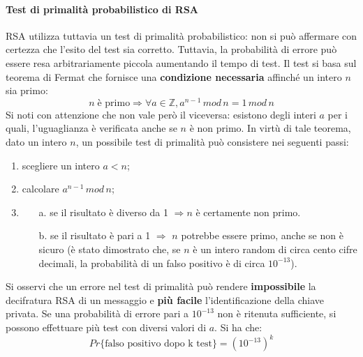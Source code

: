 \paragraph{Test di primalità probabilistico di RSA}
RSA utilizza tuttavia un test di primalità probabilistico: non si può affermare con certezza che l'esito del test sia corretto. Tuttavia, la probabilità di errore può essere resa arbitrariamente piccola aumentando il tempo di test. Il test si basa sul teorema di Fermat che fornisce una \textbf{condizione necessaria} affinché un intero $n$ sia primo: 
\begin{equation}
n \; \text{è primo} \Rightarrow \forall a \in \mathbb{Z}, a^{n-1} \, mod \, n  = 1 \, mod \, n
\end{equation}
Si noti con attenzione che non vale però il viceversa: esistono degli interi $a$ per i quali, l'uguaglianza è verificata anche se $n$ è non primo. In virtù di tale teorema, dato un intero $n$, un possibile test di primalità può consistere nei seguenti passi: 
\begin{enumerate}
\item scegliere un intero $a<n$;
\item calcolare $a^{n-1} \, mod \,n$;
\item \begin{enumerate} \item [a.] se il risultato è diverso da 1 $ \Rightarrow n$ è certamente non primo.
						\item [b.] se il risultato è pari a 1 $\Rightarrow $ $n$ potrebbe essere primo, anche se non è sicuro (è stato dimostrato che, se $n$ è un intero random di circa cento cifre decimali, la probabilità di un falso positivo è di circa $10^{-13}$).
	  \end{enumerate}
\end{enumerate}
Si osservi che un errore nel test di primalità può  rendere \textbf{impossibile} la decifratura RSA di un messaggio e \textbf{più facile} l'identificazione della chiave privata. 
\newline \newline
Se una probabilità di errore pari a $10^{-13}$ non è ritenuta sufficiente, si possono effettuare più test con diversi valori di $a$. Si ha che:
\begin{equation}
Pr \{\text{falso positivo dopo k test} \} = (10^{-13})^k
\end{equation}

